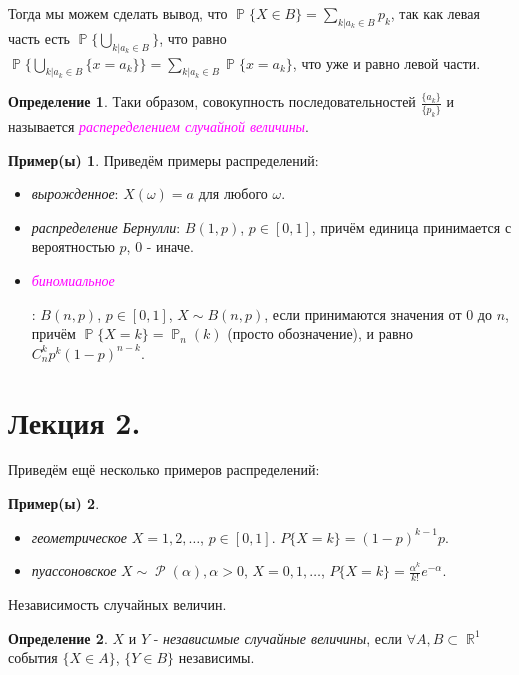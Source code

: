 \documentclass[a4paper,100pt]{article}
\theoremstyle{indented}
\theoremstyle{definition}
\newtheorem{defn}{Определение}
\newtheorem{exl}{Пример(ы)}
\theoremstyle{remark}
\DeclareMathOperator{\RR}{\mathbb{R}}
\DeclareMathOperator{\PP}{\mathbb{P}}
\DeclareMathOperator{\Rho}{\mathcal{P}}
\begin{document}
Тогда мы можем сделать вывод, что $\PP\{X\in B\}=\sum_{k\vert a_k\in B}p_k$, так как левая часть есть $\PP\{\bigcup_{k\vert a_k\in B}\}$, что равно $\PP\{\bigcup_{k\vert a_k\in B}\{x=a_k\}\}=\sum_{k\vert a_k\in B}\PP\{x=a_k\}$, что уже и равно левой части.\

\begin{defn}
    Таки образом, совокупность последовательностей $\frac{\{a_k\}}{\{p_k\}}$ и называется \hypertarget{n9}{\textcolor{magenta}{\textit{распеределением случайной величины}}}. 
\end{defn}

\begin{exl}
    Приведём примеры распределений:

    \begin{itemize}
        \item \textit{вырожденное}: $X(\omega)=a$ для любого $\omega$.
        \item \textit{распределение Бернулли}: $B(1, p)$, $p\in[0,1]$, причём единица принимается с вероятностью $p$, $0$ - иначе.
        \item \hypertarget{n10}{\textcolor{magenta}{\textit{биномиальное}}}: $B(n, p)$, $p\in[0,1]$, $X\sim B(n, p)$, если принимаются значения от $0$ до $n$, причём $\PP\{X=k\}=\PP_n(k)$ (просто обозначение), и равно $C_n^kp^k(1-p)^{n-k}$.
    \end{itemize}

\end{exl}

\section{Лекция 2.}

Приведём ещё несколько примеров распределений: 

\begin{exl}
    \begin{itemize}
        \item \textit{геометрическое} $X = 1, 2, \ldots$, $p\in[0,1]$. $P\{X=k\}=(1-p)^{k-1}p$.
        \item \textit{пуассоновское} $X\sim \Rho(\alpha), \alpha>0$, $X=0, 1, \ldots$, $P\{X=k\}=\frac{\alpha^k}{k!}e^{-\alpha}$. 
    \end{itemize}
\end{exl}

Независимость случайных величин.

\begin{defn}
    $X$ и $Y$ - \textit{независимые случайные величины}, если $\forall A, B\subset \RR^1$ события $\{X\in A\}$, $\{Y\in B\}$ независимы.
\end{defn}
\end{document}
